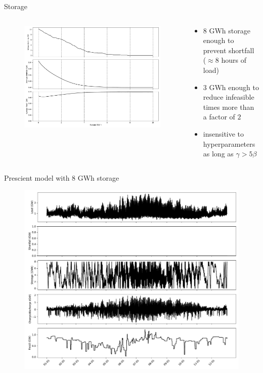 \documentclass[aspectratio=169,11pt]{beamer}
\begin{document}
\begin{frame}{Storage}
\begin{columns}
    \begin{column}{0.6\textwidth}
        \begin{figure}
            \centering
            \includegraphics[width=\columnwidth]{./figures/storage.pdf}
        \end{figure}
    \end{column}
    \begin{column}{0.4\textwidth}
        \begin{itemize}
            \item $8$ GWh storage enough to prevent shortfall ($\approx 8$ hours of load)
            \item $3$ GWh enough to reduce infeasible times more than a factor of $2$
            \item insensitive to hyperparameters as long as $\gamma > 5 \beta$
        \end{itemize}
    \end{column}
\end{columns}
\end{frame}

\begin{frame}{Prescient model with $8$ GWh storage}
\begin{figure}
    \centering
    \includegraphics[width=0.7\columnwidth]{./figures/hourly_profiles.pdf}
\end{figure}
\end{frame}
\end{document}
